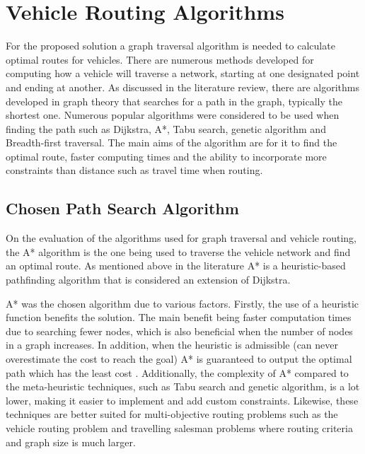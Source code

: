 \documentclass[11pt]{report}
\begin{document}
\section{Vehicle Routing Algorithms}

For the proposed solution a graph traversal algorithm is needed to calculate optimal routes for vehicles. There are numerous methods developed for computing how a vehicle will traverse a network, starting at one designated point and ending at another. As discussed in the literature review, there are algorithms developed in graph theory that searches for a path in the graph, typically the shortest one. Numerous popular algorithms were considered to be used when finding the path such as Dijkstra, A*, Tabu search, genetic algorithm and Breadth-first traversal. The main aims of the algorithm are for it to find the optimal route, faster computing times and the ability to incorporate more constraints than distance such as travel time when routing.

\subsection{Chosen Path Search Algorithm}

On the evaluation of the algorithms used for graph traversal and vehicle routing, the A* algorithm is the one being used to traverse the vehicle network and find an optimal route. As mentioned above in the literature A* is a heuristic-based pathfinding algorithm that is considered an extension of Dijkstra. 

A* was the chosen algorithm due to various factors. Firstly, the use of a heuristic function benefits the solution. The main benefit being faster computation times due to searching fewer nodes, which is also beneficial when the number of nodes in a graph increases. In addition, when the heuristic is admissible (can never overestimate the cost to reach the goal) A* is guaranteed to output the optimal path which has the least cost \autocite{rana2011star}. Additionally, the complexity of A* compared to the meta-heuristic techniques, such as Tabu search and genetic algorithm, is a lot lower, making it easier to implement and add custom constraints. Likewise, these techniques are better suited for multi-objective routing problems such as the vehicle routing problem and travelling salesman problems where routing criteria and graph size is much larger. 
\end{document}
